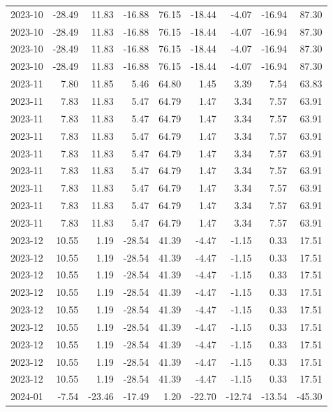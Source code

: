 \begin{table}[ht]
\begin{tabular}{lrrrrrrrr}
  2023-10 & -28.49 & 11.83 & -16.88 & 76.15 & -18.44 & -4.07 & -16.94 & 87.30 \\ 
  2023-10 & -28.49 & 11.83 & -16.88 & 76.15 & -18.44 & -4.07 & -16.94 & 87.30 \\ 
  2023-10 & -28.49 & 11.83 & -16.88 & 76.15 & -18.44 & -4.07 & -16.94 & 87.30 \\ 
  2023-10 & -28.49 & 11.83 & -16.88 & 76.15 & -18.44 & -4.07 & -16.94 & 87.30 \\ 
  2023-11 & 7.80 & 11.85 & 5.46 & 64.80 & 1.45 & 3.39 & 7.54 & 63.83 \\ 
  2023-11 & 7.83 & 11.83 & 5.47 & 64.79 & 1.47 & 3.34 & 7.57 & 63.91 \\ 
  2023-11 & 7.83 & 11.83 & 5.47 & 64.79 & 1.47 & 3.34 & 7.57 & 63.91 \\ 
  2023-11 & 7.83 & 11.83 & 5.47 & 64.79 & 1.47 & 3.34 & 7.57 & 63.91 \\ 
  2023-11 & 7.83 & 11.83 & 5.47 & 64.79 & 1.47 & 3.34 & 7.57 & 63.91 \\ 
  2023-11 & 7.83 & 11.83 & 5.47 & 64.79 & 1.47 & 3.34 & 7.57 & 63.91 \\ 
  2023-11 & 7.83 & 11.83 & 5.47 & 64.79 & 1.47 & 3.34 & 7.57 & 63.91 \\ 
  2023-11 & 7.83 & 11.83 & 5.47 & 64.79 & 1.47 & 3.34 & 7.57 & 63.91 \\ 
  2023-11 & 7.83 & 11.83 & 5.47 & 64.79 & 1.47 & 3.34 & 7.57 & 63.91 \\ 
  2023-12 & 10.55 & 1.19 & -28.54 & 41.39 & -4.47 & -1.15 & 0.33 & 17.51 \\ 
  2023-12 & 10.55 & 1.19 & -28.54 & 41.39 & -4.47 & -1.15 & 0.33 & 17.51 \\ 
  2023-12 & 10.55 & 1.19 & -28.54 & 41.39 & -4.47 & -1.15 & 0.33 & 17.51 \\ 
  2023-12 & 10.55 & 1.19 & -28.54 & 41.39 & -4.47 & -1.15 & 0.33 & 17.51 \\ 
  2023-12 & 10.55 & 1.19 & -28.54 & 41.39 & -4.47 & -1.15 & 0.33 & 17.51 \\ 
  2023-12 & 10.55 & 1.19 & -28.54 & 41.39 & -4.47 & -1.15 & 0.33 & 17.51 \\ 
  2023-12 & 10.55 & 1.19 & -28.54 & 41.39 & -4.47 & -1.15 & 0.33 & 17.51 \\ 
  2023-12 & 10.55 & 1.19 & -28.54 & 41.39 & -4.47 & -1.15 & 0.33 & 17.51 \\ 
  2023-12 & 10.55 & 1.19 & -28.54 & 41.39 & -4.47 & -1.15 & 0.33 & 17.51 \\ 
  2024-01 & -7.54 & -23.46 & -17.49 & 1.20 & -22.70 & -12.74 & -13.54 & -45.30 \\ 

\end{tabular}
\end{table}
